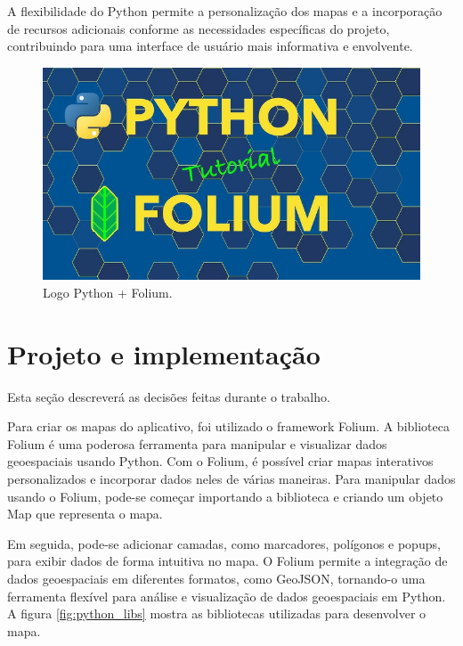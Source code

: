     A flexibilidade do Python permite a personalização dos mapas e a incorporação de recursos adicionais conforme as necessidades específicas do projeto, contribuindo para uma interface de usuário mais informativa e envolvente.

      \begin{figure}[hp]
    \centering
    
    \includegraphics[scale=0.1]{figures/python_folium.jpg}
    
    \caption{Logo Python + Folium.}
\end{figure}



\section{Projeto e implementação}
Esta seção descreverá as decisões feitas durante o trabalho.

Para criar os mapas do aplicativo, foi utilizado o framework Folium. A biblioteca Folium é uma poderosa ferramenta para manipular e visualizar dados geoespaciais usando Python. Com o Folium, é possível criar mapas interativos personalizados e incorporar dados neles de várias maneiras. Para manipular dados usando o Folium, pode-se começar importando a biblioteca e criando um objeto Map que representa o mapa. 

Em seguida, pode-se adicionar camadas, como marcadores, polígonos e popups, para exibir dados de forma intuitiva no mapa. O Folium permite a integração de dados geoespaciais em diferentes formatos, como GeoJSON, tornando-o uma ferramenta flexível para análise e visualização de dados geoespaciais em Python. A figura \ref{fig:python_libs} mostra as bibliotecas utilizadas para desenvolver o mapa.

